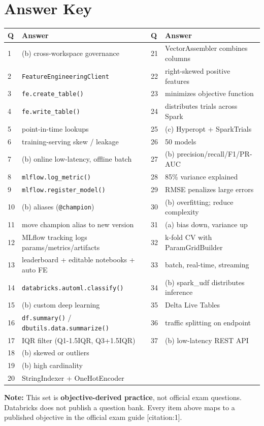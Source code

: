 \documentclass[11pt]{article}
\begin{document}
	\newpage
	\section*{Answer Key}
	
	\begin{longtable}{@{}p{0.8cm}p{8.0cm}p{0.8cm}p{6.2cm}@{}}
		\toprule
		\textbf{Q} & \textbf{Answer} & \textbf{Q} & \textbf{Answer} \\
		\midrule
		\endhead
		1 & (b) cross-workspace governance & 21 & VectorAssembler combines columns \\
		2 & \texttt{FeatureEngineeringClient} & 22 & right-skewed positive features \\
		3 & \texttt{fe.create\_table()} & 23 & minimizes objective function \\
		4 & \texttt{fe.write\_table()} & 24 & distributes trials across Spark \\
		5 & point-in-time lookups & 25 & (c) Hyperopt + SparkTrials \\
		6 & training-serving skew / leakage & 26 & 50 models \\
		7 & (b) online low-latency, offline batch & 27 & (b) precision/recall/F1/PR-AUC \\
		8 & \texttt{mlflow.log\_metric()} & 28 & 85\% variance explained \\
		9 & \texttt{mlflow.register\_model()} & 29 & RMSE penalizes large errors \\
		10 & (b) aliases (\texttt{@champion}) & 30 & (b) overfitting; reduce complexity \\
		11 & move champion alias to new version & 31 & (a) bias down, variance up \\
		12 & MLflow tracking logs params/metrics/artifacts & 32 & k-fold CV with ParamGridBuilder \\
		13 & leaderboard + editable notebooks + auto FE & 33 & batch, real-time, streaming \\
		14 & \texttt{databricks.automl.classify()} & 34 & (b) spark\_udf distributes inference \\
		15 & (b) custom deep learning & 35 & Delta Live Tables \\
		16 & \texttt{df.summary()} / \texttt{dbutils.data.summarize()} & 36 & traffic splitting on endpoint \\
		17 & IQR filter (Q1-1.5IQR, Q3+1.5IQR) & 37 & (b) low-latency REST API \\
		18 & (b) skewed or outliers & & \\
		19 & (b) high cardinality & & \\
		20 & StringIndexer + OneHotEncoder & & \\
		\bottomrule
	\end{longtable}
	
	\vspace{1em}
	\noindent\textbf{Note:} This set is \textbf{objective-derived practice}, not official exam questions. Databricks does not publish a question bank. Every item above maps to a published objective in the official exam guide [citation:1].
	
\end{document}
